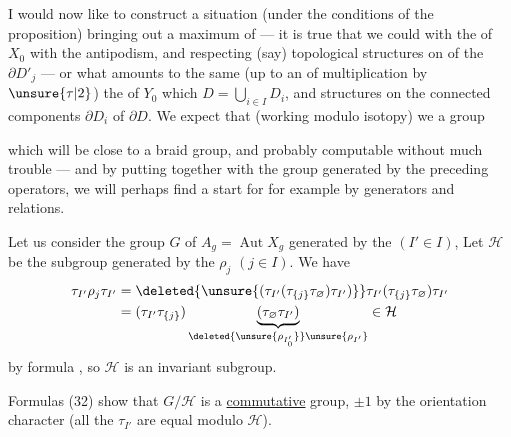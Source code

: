I would now like to construct a situation (under the conditions of the proposition) bringing out a maximum of  --- it is true that we could  with  the  of $X_0$  with the antipodism\inserted{$\tau$},  and respecting (say) topological  structures on  of the $\partial D'_j$ --- or what  amounts to the same (up to an  of multiplication by $\unsure{\tau|2}$) the  of $Y_0$ which   $D=\bigcup_{i\in I}D_i$, and   structures on  the connected components $\partial D_i$ of $\partial D$. We expect that (working modulo isotopy) we  a group



which will be close to a braid group, and probably computable without much trouble --- and by putting  together with the group generated by the preceding operators, we will perhaps find a start for  for example  by generators  and relations.

Let us consider the group $G$ of $A_g=\operatorname{Aut}X_g$ generated by the  $(I'\in I)$,  Let $\mathcal H$  be the subgroup generated by the $\rho_j$ $(j\in I)$. We have
\[
\begin{aligned}
\tau_{I'}\rho_j\tau_{I'}
&=\deleted{\unsure{(\tau_{I'}(\tau_{\{j\}}\tau_{\varnothing})\tau_{I'})}}
\tau_{I'}(\tau_{\{j\}}\tau_{\varnothing})\tau_{I'}\\
&=(\tau_{I'}\tau_{\{j\}})
\underbrace{(\tau_{\varnothing}\tau_{I'})}_{\deleted{\unsure{\rho_{I'_0}}}\unsure{\rho_{I'}}}
\in\mathcal H
\end{aligned}
\]
by formula , so $\mathcal H$ is an invariant subgroup.

Formulas (32) show that $G/\mathcal H$ is a \uline{commutative} group,  $\pm1$ by the orientation character (all the $\tau_{I'}$ are equal modulo $\mathcal H$).